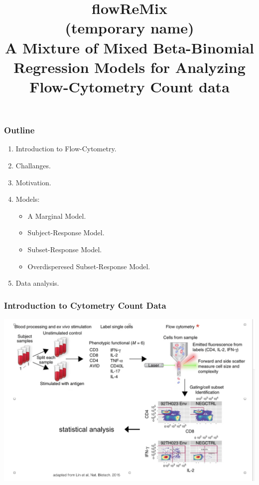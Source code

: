 \documentclass{beamer}
\theoremstyle{definition}
\begin{document}
\title{\textbf{\LARGE{flowReMix}}  \\ (temporary name)  \vspace{ 1 cm }\\ \large{A \textbf{Mixture} of \textbf{Mixed} Beta-Binomial \textbf{Regression} Models for Analyzing \textbf{Flow}-Cytometry Count data}}

\vspace{1 cm}


\begin{frame}[plain]
  \titlepage
\end{frame}



\begin{frame}
\frametitle{Outline}
\begin{enumerate}
\item Introduction to Flow-Cytometry.
\vspace{0.3 cm}
\item Challanges.
\vspace{0.3 cm}
\item Motivation.
\vspace{0.3 cm}
\item Models:
	\begin{itemize}
	\item A Marginal Model.
	\item Subject-Response Model.
	\item Subset-Response Model.
	\item Overdisperesed Subset-Response Model. 
	\end{itemize}
	\vspace{0.3 cm}
\item Data analysis. 
\end{enumerate}
\end{frame}





\begin{frame}
\frametitle{Introduction to Cytometry Count Data}
\begin{center}
\includegraphics[scale=0.4]{figures/flowcytintro}
\end{center}
\end{frame}
\end{document}
